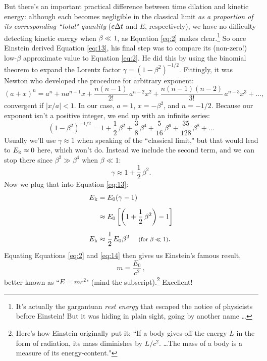 \documentclass[12pt]{article}
\begin{document}
But there's an important practical difference between time dilation and kinetic energy: although each becomes negligible in the classical limit \emph{as a proportion of its corresponding ``total" quantity} ($c \mkern.5mu \Delta t$ and $E$, respectively), we have no difficulty detecting kinetic energy when $\beta \ll 1$, as Equation \ref{eq:2} makes clear.\footnote{It's actually the gargantuan \emph{rest energy} that escaped the notice of physicists before Einstein! But it was hiding in plain sight, going by another name \dots} So once Einstein derived Equation \ref{eq:13}, his final step was to compare its (non-zero!) low-$\beta$ approximate value to Equation \ref{eq:2}. He did this by using the binomial theorem to expand the Lorentz factor $\gamma = (1-\beta^2)^{-1/2}$. Fittingly, it was Newton who developed the procedure for arbitrary exponent:
\begin{equation*}
(a+x)^n = a^n + na^{n-1}x + \frac{n(n-1)}{2!} \, a^{n-2}x^2 + \frac{n(n-1)(n-2)}{3!} \, a^{n-3}x^3 + \dots ,
\end{equation*}
convergent if $|x/a| < 1$. In our case, $a=1$, $x=-\beta^2$, and $n=-1/2$. Because our exponent isn't a positive integer, we end up with an infinite series:
\begin{equation*}
\left(1-\beta^2\right)^{-1/2}=1 + \dfrac{1}{2}\,\beta^2 +  \frac {3}{8} \, \beta^4 + \frac{5}{16} \, \beta^6 + \frac{35}{128} \, \beta^8 + \dots
\end{equation*}
Usually we'll use $\gamma \approx 1$ when speaking of the ``classical limit," but that would lead to $E_{\mkern.5mu \textrm{k}} \approx 0$ here, which won't do. Instead we include the second term, and we can stop there since $\beta^2 \gg \beta^4$ when $\beta \ll 1$:
\begin{equation*}
\gamma \approx 1 + \dfrac{1}{2}\,\beta^2.
\end{equation*}
Now we plug that into Equation \ref{eq:13}:
\begin{equation}\label{eq:14}
\begin{split}
E_{\mkern.5mu \textrm{k}} &=E_0 (\gamma - 1)\\[5pt]
&\approx E_0 \left[ \left( 1 + \dfrac{1}{2}\,\beta^2 \right) -1 \right] \\[5pt]
E_{\mkern.5mu \textrm{k}} &\approx \frac{1}{2} \mkern2mu E_0 \mkern.5mu \beta^2 \quad \textrm{\footnotesize{ (for $\beta \ll 1$)}}.
\end{split}
\end{equation}
Equating Equations \ref{eq:2} and \ref{eq:14} then gives us Einstein's famous result,
\begin{equation}\label{eq:15}
\boxed{m = \frac{E_0}{c^2}} \, ,
\end{equation}
better known as ``$E = mc^2$" (mind the subscript).\footnote{Here's how Einstein originally put it: ``If a body gives off the energy $L$ in the form of radiation, its mass diminishes by $L / c^2$. \ldots The mass of a body is a measure of its energy-content."} Excellent!
\end{document}
